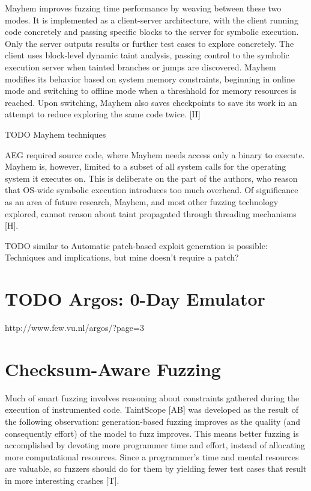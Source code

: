 \documentclass[11pt,expanded,copyright]{fsuthesis}
\begin{document}
Mayhem improves fuzzing time performance by weaving between these two modes. It is implemented as a client-server architecture, with the client running code concretely and passing specific blocks to the server for symbolic execution. Only the server outputs results or further test cases to explore concretely. The client uses block-level dynamic taint analysis, passing control to the symbolic execution server when tainted branches or jumps are discovered. Mayhem modifies its behavior based on system memory constraints, beginning in online mode and switching to offline mode when a threshhold for memory resources is reached. Upon switching, Mayhem also saves checkpoints to save its work in an attempt to reduce exploring the same code twice. [H]

TODO Mayhem techniques

AEG required source code, where Mayhem needs access only a binary to execute. Mayhem is, however, limited to a subset of all system calls for the operating system it executes on. This is deliberate on the part of the authors, who reason that OS-wide symbolic execution introduces too much overhead. Of significance as an area of future research, Mayhem, and most other fuzzing technology explored, cannot reason about taint propagated through threading mechanisms [H].


TODO similar to Automatic
patch-based exploit generation is possible: Techniques and
implications, but mine doesn't require a patch?

\section{TODO Argos: 0-Day Emulator}

http://www.few.vu.nl/argos/?page=3

\section{Checksum-Aware Fuzzing}

Much of smart fuzzing involves reasoning about constraints gathered during the execution of instrumented code. TaintScope [AB] was developed as the result of the following observation: generation-based fuzzing improves as the quality (and consequently effort) of the model to fuzz improves. This means better fuzzing is accomplished by devoting more programmer time and effort, instead of allocating more computational resources. Since a programmer's time and mental resources are valuable, so fuzzers should do for them by yielding fewer test cases that result in more interesting crashes [T].
\end{document}
